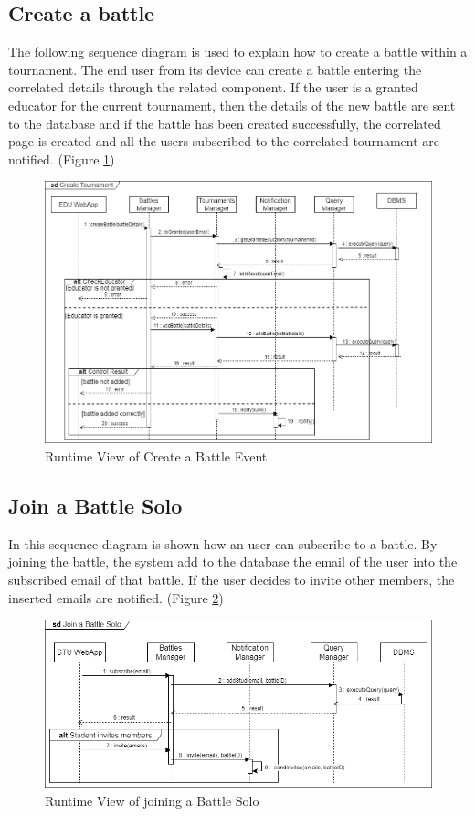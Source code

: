 \subsection{Create a battle}
The following sequence diagram is used to explain how to create a battle within a tournament. The end user from its device can create a battle entering the correlated details through the related component. If the user is a granted educator for the current tournament, then the details of the new battle are sent to the database and if the battle has been created successfully, the correlated page is created and all the users subscribed to the correlated tournament are notified. (Figure \ref{fig:RuntimeView_CreateBattle})
\begin{figure}[H]
    \centering
    \includegraphics[width=\textwidth]{images/runtimeviews/RuntimeView_CreateBattle.png}
    \caption{Runtime View of Create a Battle Event}
    \label{fig:RuntimeView_CreateBattle}
\end{figure}

\subsection{Join a Battle Solo}
In this sequence diagram is shown how an user can subscribe to a battle. By joining the battle, the system add to the database the email of the user into the subscribed email of that battle. If the user decides to invite other members, the inserted emails are notified. (Figure \ref{fig:RuntimeView_JoinBattleSolo})
\begin{figure}[H]
    \centering
    \includegraphics[width=\textwidth]{images/runtimeviews/RuntimeView_JoinBattleSolo.png}
    \caption{Runtime View of joining a Battle Solo}
    \label{fig:RuntimeView_JoinBattleSolo}
\end{figure}

